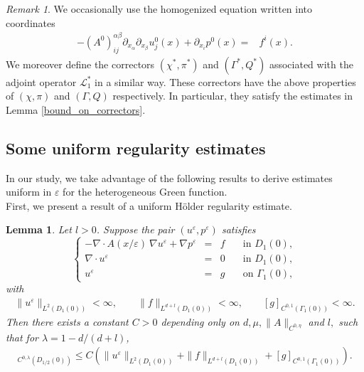\documentclass[11pt, reqno]{amsart}
\newtheorem{lemma}[theorem]{Lemma}
\theoremstyle{definition}
\theoremstyle{remark}
\newtheorem{remark}[theorem]{Remark}
\numberwithin{equation}{section}
\begin{document}
	\begin{remark}\label{Rmk_starcorrectors} We occasionally use the homogenized equation written into coordinates
	\begin{align}
			- (A^0)_{ij}^{\alpha\beta} \partial_{x_{\alpha}}\partial_{x_{\beta}}u_j^0 (x)  +   \partial_{x_i} p^0(x)	=& f^i(x).\label{eq_homgn}
		\end{align}
	We moreover define the correctors $(\chi^*, \pi^*)$ and $(\Gamma^*, Q^*)$ associated with the adjoint operator $\mathcal{L}^*_1$ in a similar way. These correctors have the above properties of  $(\chi, \pi)$ and $(\Gamma, Q)$ respectively. In particular, they satisfy the estimates in \textup{Lemma \ref{bound_on_correctors}}.
	
	\end{remark}
	
	
	
	\subsection{Some uniform regularity estimates}
	
	\noindent In our study, we take advantage of the following results to derive estimates uniform in $\varepsilon$ for the heterogeneous Green function.\\
	
	\noindent First, we present a result of a uniform H\"older regularity estimate.
	\begin{lemma}\label{Holder_estim}
		Let $l>0$. Suppose the pair $(u^\varepsilon, p^\varepsilon)$ satisfies 
		\begin{equation}
			\left\{
			\begin{array}{rcll}
				-\nabla\cdot A(x/\varepsilon) \: \nabla u^\varepsilon  +  \nabla p^\varepsilon &=&  f \quad& \mbox{in } D_1(0),\\
				\nabla\cdot u^\varepsilon&=& 0   \quad & \mbox{in } D_1(0),\\
				u^\varepsilon &=& g\quad & \mbox{on } \Gamma_1(0),
			\end{array}
			\right. 
		\end{equation}
		with \begin{align*}
			\| u^\varepsilon \|_{L^2(D_{1}(0))}< \infty ,\qquad     \| f\|_{L^{d+l}(D_{1}(0))}< \infty ,\qquad     [g]_{C^{0,1}(\Gamma _{1}(0))}< \infty .
		\end{align*}
		Then there exists a constant $C>0$ depending only on $d, \mu, \|A\|_{C^{0,\eta}}$ and $l,$ such that for $\lambda=1- d/(d+l)$, 
		\begin{align*}
			[u^\varepsilon]_{C^{0,\lambda}(D_{1/2}(0))} \leq C \left(  \| u^\varepsilon \|_{L^2(D_{1}(0))}+    \| f\|_{L^{d+l}(D_{1}(0))}+  [g]_{C^{0,1}(\Gamma _{1}(0))}\right) .
		\end{align*}
	\end{lemma}
	
\end{document}
